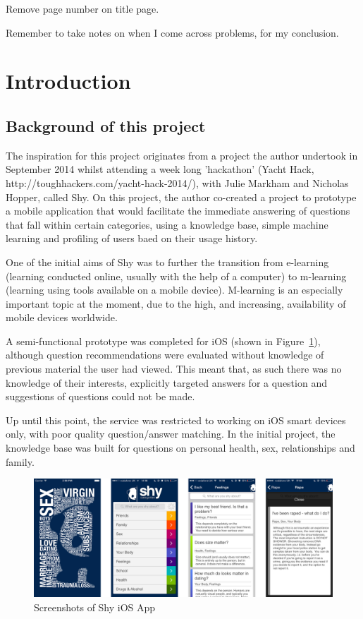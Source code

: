 \documentclass{article}
\begin{document}
Remove page number on title page.

Remember to take notes on when I come across problems, for my conclusion.

\newpage
\section{Introduction}

\subsection{Background of this project}

The inspiration for this project originates from a project the author undertook in September 2014 whilst attending a week long 'hackathon' (Yacht Hack, http://toughhackers.com/yacht-hack-2014/), with Julie Markham and Nicholas Hopper, called Shy.  On this project, the author co-created a project to prototype a mobile application that would facilitate the immediate answering of questions that fall within certain categories, using a knowledge base, simple machine learning and profiling of users baed on their usage history.

One of the initial aims of Shy was to further the transition from e-learning (learning conducted online, usually with the help of a computer) to m-learning (learning using tools available on a mobile device).  M-learning is an especially important topic at the moment, due to the high, and increasing, availability of mobile devices worldwide.

A semi-functional prototype was completed for iOS (shown in Figure~\ref{fig:shy-ios-screenshots}), although question recommendations were evaluated without knowledge of previous material the user had viewed.  This meant that, as such there was no knowledge of their interests, explicitly targeted answers for a question and suggestions of questions could not be made.

Up until this point, the service was restricted to working on iOS smart devices only, with poor quality question/answer matching.  In the initial project, the knowledge base was built for questions on personal health, sex, relationships and family.


\begin{figure}[htb] 
\includegraphics[width=\linewidth]{shy-screenshots}
\caption{Screenshots of Shy iOS App}
\label{fig:shy-ios-screenshots}
\end{figure}
\end{document}
